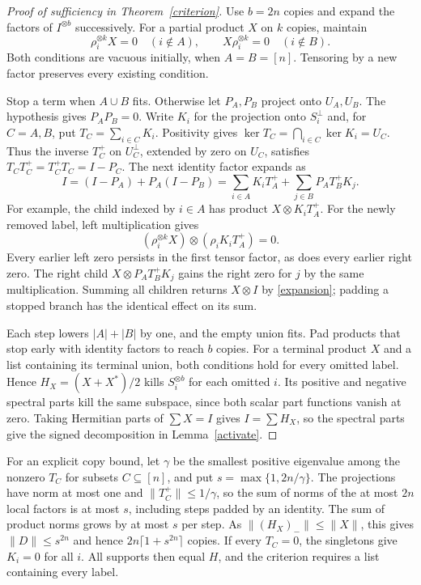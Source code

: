 \documentclass[11pt,a4paper]{article}
\theoremstyle{remark}
\begin{document}
\begin{proof}[Proof of sufficiency in Theorem~\ref{criterion}]
Use \(b=2n\) copies and expand the factors of \(I^{\otimes b}\) successively. For a partial product \(X\) on \(k\) copies, maintain
\[
 \rho_i^{\otimes k}X=0\quad(i\notin A),\qquad
 X\rho_i^{\otimes k}=0\quad(i\notin B).
\]
Both conditions are vacuous initially, when \(A=B=[n]\). Tensoring by a new factor preserves every existing condition.

Stop a term when \(A\cup B\) fits. Otherwise let \(P_A,P_B\) project onto \(U_A,U_B\). The hypothesis gives \(P_AP_B=0\). Write \(K_i\) for the projection onto \(S_i^\perp\) and, for \(C=A,B\), put \(T_C=\sum_{i\in C}K_i\). Positivity gives \(\ker T_C=\bigcap_{i\in C}\ker K_i=U_C\). Thus the inverse \(T_C^+\) on \(U_C^\perp\), extended by zero on \(U_C\), satisfies \(T_CT_C^+=T_C^+T_C=I-P_C\). The next identity factor expands as
\begin{equation}\label{expansion}
 I=(I-P_A)+P_A(I-P_B)
   =\sum_{i\in A} K_i T_A^+
       +\sum_{j\in B} P_A T_B^+ K_j .
\end{equation}
For example, the child indexed by \(i\in A\) has product \(X\otimes K_iT_A^+\). For the newly removed label, left multiplication gives
\[
 (\rho_i^{\otimes k}X)\otimes(\rho_iK_iT_A^+)=0.
\]
Every earlier left zero persists in the first tensor factor, as does every earlier right zero. The right child \(X\otimes P_AT_B^+K_j\) gains the right zero for \(j\) by the same multiplication. Summing all children returns \(X\otimes I\) by \eqref{expansion}; padding a stopped branch has the identical effect on its sum.

Each step lowers \(|A|+|B|\) by one, and the empty union fits. Pad products that stop early with identity factors to reach \(b\) copies. For a terminal product \(X\) and a list containing its terminal union, both conditions hold for every omitted label. Hence \(H_X=(X+X^*)/2\) kills \(S_i^{\otimes b}\) for each omitted \(i\). Its positive and negative spectral parts kill the same subspace, since both scalar part functions vanish at zero. Taking Hermitian parts of \(\sum X=I\) gives \(I=\sum H_X\), so the spectral parts give the signed decomposition in Lemma~\ref{activate}.
\end{proof}

For an explicit copy bound, let \(\gamma\) be the smallest positive eigenvalue among the nonzero \(T_C\) for subsets \(C\subseteq[n]\), and put \(s=\max\{1,2n/\gamma\}\). The projections have norm at most one and \(\|T_C^+\|\le1/\gamma\), so the sum of norms of the at most \(2n\) local factors is at most \(s\), including steps padded by an identity. The sum of product norms grows by at most \(s\) per step. As \(\|(H_X)_-\|\le\|X\|\), this gives \(\|D\|\le s^{2n}\) and hence \(2n\lceil1+s^{2n}\rceil\) copies. If every \(T_C=0\), the singletons give \(K_i=0\) for all \(i\). All supports then equal \(H\), and the criterion requires a list containing every label.
\end{document}
